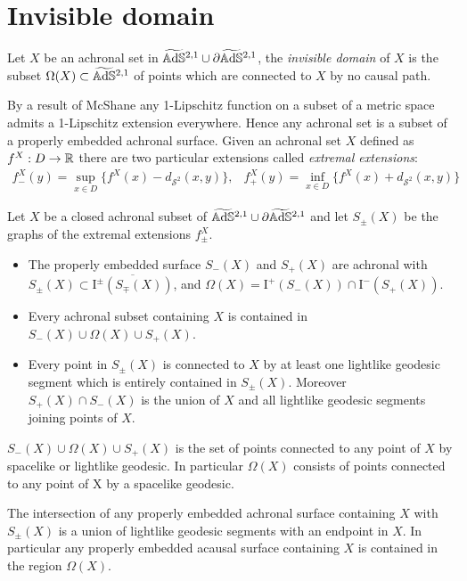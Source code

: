 \section{Invisible domain}
\begin{definition}
    Let $X$ be an achronal set in $\widetilde{\mathbb{A}\mathrm{d}\mathbb{S}}{}^{2,1} \cup \partial\widetilde{\mathbb{A}\mathrm{d}\mathbb{S}}{}^{2,1}$, the \textit{invisible domain} of $X$ is the subset $\Omega(X) \subset \widetilde{\mathbb{A}\mathrm{d}\mathbb{S}}{}^{2,1}$ of points which are connected to $X$ by no causal path.
\end{definition}
By a result of McShane \cite{mcshane1934extension} any 1-Lipschitz function on a subset of a metric space admits a 1-Lipschitz extension everywhere. Hence any achronal set is a subset of a properly embedded achronal surface.
Given an achronal set $X$ defined as $f^X : D \to \mathbb{R}$ there are two particular extensions called \textit{extremal extensions}:
\[
\begin{array}{cc}
    f_-^X(y)= \sup_{x\in D}\{ f^X(x)-d_{\mathcal{S}^2}(x,y) \}, & f_+^X(y)= \inf_{x\in D}\{ f^X(x)+d_{\mathcal{S}^2}(x,y) \}
\end{array}
\]
\begin{lemma}\label{lem:extremal extension}
    Let $X$ be a closed achronal subset of $\widetilde{\mathbb{A}\mathrm{d}\mathbb{S}}{}^{2,1} \cup \partial\widetilde{\mathbb{A}\mathrm{d}\mathbb{S}}{}^{2,1}$ and let $S_\pm (X)$ be the graphs of the extremal extensions $f^X_\pm$.
    \begin{itemize}
        \item The properly embedded surface $S_-(X)$ and $S_+(X)$ are achronal with $S_\pm(X) \subset \overline{\text{I}^\pm (S_\mp(X))}$, and $\Omega(X) = \text{I}^+(S_-(X)) \cap \text{I}^-(S_+(X))$.
        \item Every achronal subset containing $X$ is contained in $S_-(X)\cup\Omega(X)\cup S_+(X)$.
        \item Every point in $S_\pm(X)$ is connected to $X$ by at least one lightlike geodesic segment which is entirely contained in $S_\pm(X)$. Moreover $S_+(X) \cap S_-(X)$ is the union of $X$ and all lightlike geodesic segments joining points of $X$.
    \end{itemize}
\end{lemma}

\begin{observation}
    $S_-(X)\cup\Omega(X)\cup S_+(X)$ is the set of points connected to any point of $X$ by spacelike or lightlike geodesic. In particular $\Omega(X)$ consists of points connected to any point of X by a spacelike geodesic.
\end{observation}
\begin{observation}
    The intersection of any properly embedded achronal surface containing
    $X$ with $S_\pm(X)$ is a union of lightlike geodesic segments with an endpoint in $X$. In particular any properly embedded acausal surface containing $X$ is contained in the region $\Omega(X)$.
\end{observation}

